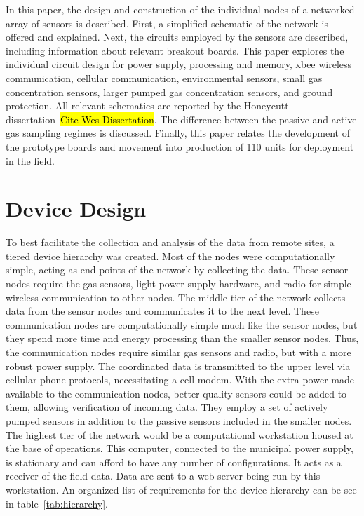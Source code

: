 \documentclass[journal]{IEEEtran}
\begin{document}
In this paper, the design and construction of the individual nodes of a networked array of sensors is described.  First, a simplified schematic of the network is offered and explained.  Next, the circuits employed by the sensors are described, including information about relevant breakout boards.  This paper explores the individual circuit design for power supply, processing and memory, xbee wireless communication, cellular communication, environmental sensors, small gas concentration sensors, larger pumped gas concentration sensors, and ground protection.  All relevant schematics are reported by the Honeycutt dissertation~\hl{Cite Wes Dissertation}.  The difference between the passive and active gas sampling regimes is discussed.  Finally, this paper relates the development of the prototype boards and movement into production of 110 units for deployment in the field.


\section{Device Design}

To best facilitate the collection and analysis of the data from remote sites, a tiered device hierarchy was created.  Most of the nodes were computationally simple, acting as end points of the network by collecting the data.  These sensor nodes require the gas sensors, light power supply hardware, and radio for simple wireless communication to other nodes.  The middle tier of the network collects data from the sensor nodes and communicates it to the next level.  These communication nodes are computationally simple much like the sensor nodes, but they spend more time and energy processing than the smaller sensor nodes.  Thus, the communication nodes require similar gas sensors and radio, but with a more robust power supply.  The coordinated data is transmitted to the upper level via cellular phone protocols, necessitating a cell modem.  With the extra power made available to the communication nodes, better quality sensors could be added to them, allowing verification of incoming data.  They employ a set of actively pumped sensors in addition to the passive sensors included in the smaller nodes.  The highest tier of the network would be a computational workstation housed at the base of operations.  This computer, connected to the municipal power supply, is stationary and can afford to have any number of configurations.  It acts as a receiver of the field data.  Data are sent to a web server being run by this workstation.  An organized list of requirements for the device hierarchy can be see in table~\ref{tab:hierarchy}.
\end{document}
